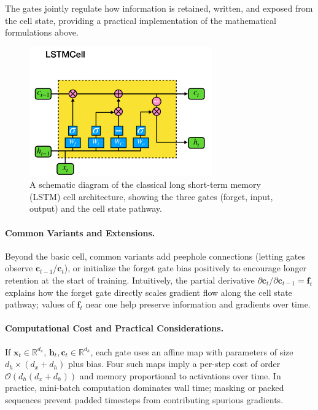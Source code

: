 The gates jointly regulate how information is retained, written, and exposed from the cell state, providing a practical implementation of the mathematical formulations above.

\begin{figure}[tbp]
\centering
\includegraphics[width=0.7\textwidth]{logos/ClassicalLSTM_Diagram.pdf}
\caption[LSTM cell diagram]{A schematic diagram of the classical long short-term memory (LSTM) cell architecture, showing the three gates (forget, input, output) and the cell state pathway. \cite{chen2020quantumlongshorttermmemory}}
\label{fig:lstm_cell_diagram}
\end{figure}

\paragraph{Common Variants and Extensions.} Beyond the basic cell, common variants add peephole connections (letting gates observe \(\mathbf{c}_{t-1}\)/\(\mathbf{c}_t\)), or initialize the forget gate bias positively to encourage longer retention at the start of training. Intuitively, the partial derivative \(\partial \mathbf{c}_t/\partial \mathbf{c}_{t-1} = \mathbf{f}_t\) explains how the forget gate directly scales gradient flow along the cell state pathway; values of \(\mathbf{f}_t\) near one help preserve information and gradients over time.

\paragraph{Computational Cost and Practical Considerations.} If \(\mathbf{x}_t \in \mathbb{R}^{d_x}\), \(\mathbf{h}_t, \mathbf{c}_t \in \mathbb{R}^{d_h}\), each gate uses an affine map with parameters of size \(d_h\times(d_x+d_h)\) plus bias. Four such maps imply a per-step cost of order \(\mathcal{O}(d_h(d_x+d_h))\) and memory proportional to activations over time. In practice, mini-batch computation dominates wall time; masking or packed sequences prevent padded timesteps from contributing spurious gradients.

